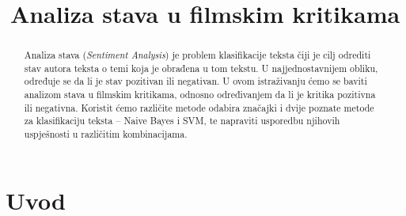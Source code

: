 \documentclass[conference]{IEEEtran}
\begin{document}
\title{Analiza stava u filmskim kritikama}


\author{
	\and
	\and
}

\maketitle

\begin{abstract}
Analiza stava (\textit{Sentiment Analysis}) je problem klasifikacije teksta čiji je cilj odrediti stav autora teksta o temi koja je obrađena u tom tekstu. U najjednostavnijem obliku, određuje se da li je stav pozitivan ili negativan. U ovom istraživanju ćemo se baviti analizom stava u filmskim kritikama, odnosno određivanjem da li je kritika pozitivna ili negativna. Koristit ćemo različite metode odabira značajki i dvije poznate metode za klasifikaciju teksta -- Naive Bayes i SVM, te napraviti usporedbu njihovih uspješnosti u različitim kombinacijama.
\end{abstract}

\IEEEpeerreviewmaketitle

\section{Uvod}
\end{document}
